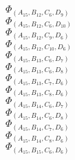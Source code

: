 \documentclass[14pt]{article}
\begin{document}
    $\Phi_{({A}_{15}, {B}_{12}, {C}_{6}, {D}_{9})}$ \\ 
    $\Phi_{({A}_{15}, {B}_{12}, {C}_{6}, {D}_{10})}$ \\ 
    $\Phi_{({A}_{15}, {B}_{12}, {C}_{9}, {D}_{6})}$ \\ 
    $\Phi_{({A}_{15}, {B}_{12}, {C}_{10}, {D}_{6})}$ \\ 
    $\Phi_{({A}_{15}, {B}_{13}, {C}_{6}, {D}_{7})}$ \\ 
    $\Phi_{({A}_{15}, {B}_{13}, {C}_{6}, {D}_{8})}$ \\ 
    $\Phi_{({A}_{15}, {B}_{13}, {C}_{7}, {D}_{6})}$ \\ 
    $\Phi_{({A}_{15}, {B}_{13}, {C}_{8}, {D}_{6})}$ \\ 
    $\Phi_{({A}_{15}, {B}_{14}, {C}_{6}, {D}_{7})}$ \\ 
    $\Phi_{({A}_{15}, {B}_{14}, {C}_{6}, {D}_{8})}$ \\ 
    $\Phi_{({A}_{15}, {B}_{14}, {C}_{7}, {D}_{6})}$ \\ 
    $\Phi_{({A}_{15}, {B}_{14}, {C}_{8}, {D}_{6})}$ \\ 
    $\Phi_{({A}_{15}, {B}_{15}, {C}_{6}, {D}_{6})}$ \\ 
    
\end{document}
